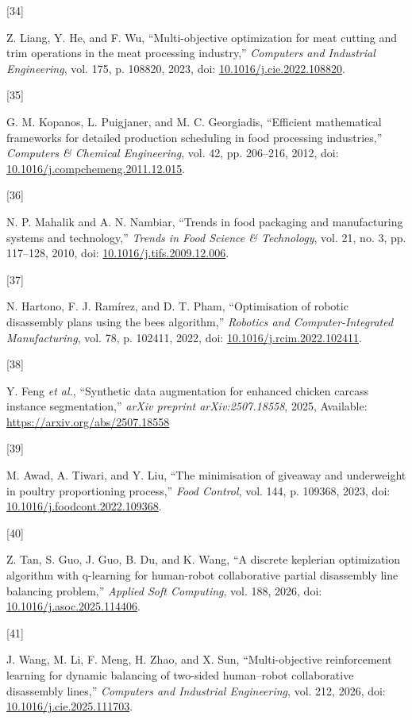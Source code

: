 \documentclass[
  spanish,
  12pt,
]{article}
\newlength{\cslhangindent}
\newlength{\csllabelwidth}
\newenvironment{CSLReferences}[2] %
 {\begin{list}{}{%
  \setlength{\itemindent}{0pt}
  \setlength{\leftmargin}{0pt}
  \setlength{\parsep}{0pt}
  \ifodd #1
   \setlength{\leftmargin}{\cslhangindent}
   \setlength{\itemindent}{-1\cslhangindent}
  \fi
  \setlength{\itemsep}{#2\baselineskip}}}
 {\end{list}}
\newcommand{\CSLLeftMargin}[1]{\parbox[t]{\csllabelwidth}{\strut#1\strut}}
\newcommand{\CSLRightInline}[1]{\parbox[t]{\linewidth - \csllabelwidth}{\strut#1\strut}}
\begin{document}
\begin{CSLReferences}{0}{0}
\CSLLeftMargin{{[}34{]} }%
\CSLRightInline{Z. Liang, Y. He, and F. Wu, {``Multi-objective
optimization for meat cutting and trim operations in the meat processing
industry,''} \emph{Computers and Industrial Engineering}, vol. 175, p.
108820, 2023, doi:
\href{https://doi.org/10.1016/j.cie.2022.108820}{10.1016/j.cie.2022.108820}.}

\CSLLeftMargin{{[}35{]} }%
\CSLRightInline{G. M. Kopanos, L. Puigjaner, and M. C. Georgiadis,
{``Efficient mathematical frameworks for detailed production scheduling
in food processing industries,''} \emph{Computers \& Chemical
Engineering}, vol. 42, pp. 206--216, 2012, doi:
\href{https://doi.org/10.1016/j.compchemeng.2011.12.015}{10.1016/j.compchemeng.2011.12.015}.}

\CSLLeftMargin{{[}36{]} }%
\CSLRightInline{N. P. Mahalik and A. N. Nambiar, {``Trends in food
packaging and manufacturing systems and technology,''} \emph{Trends in
Food Science \& Technology}, vol. 21, no. 3, pp. 117--128, 2010, doi:
\href{https://doi.org/10.1016/j.tifs.2009.12.006}{10.1016/j.tifs.2009.12.006}.}

\CSLLeftMargin{{[}37{]} }%
\CSLRightInline{N. Hartono, F. J. Ramírez, and D. T. Pham,
{``Optimisation of robotic disassembly plans using the bees
algorithm,''} \emph{Robotics and Computer-Integrated Manufacturing},
vol. 78, p. 102411, 2022, doi:
\href{https://doi.org/10.1016/j.rcim.2022.102411}{10.1016/j.rcim.2022.102411}.}

\CSLLeftMargin{{[}38{]} }%
\CSLRightInline{Y. Feng \emph{et al.}, {``Synthetic data augmentation
for enhanced chicken carcass instance segmentation,''} \emph{arXiv
preprint arXiv:2507.18558}, 2025, Available:
\url{https://arxiv.org/abs/2507.18558}}

\CSLLeftMargin{{[}39{]} }%
\CSLRightInline{M. Awad, A. Tiwari, and Y. Liu, {``The minimisation of
giveaway and underweight in poultry proportioning process,''} \emph{Food
Control}, vol. 144, p. 109368, 2023, doi:
\href{https://doi.org/10.1016/j.foodcont.2022.109368}{10.1016/j.foodcont.2022.109368}.}

\CSLLeftMargin{{[}40{]} }%
\CSLRightInline{Z. Tan, S. Guo, J. Guo, B. Du, and K. Wang, {``A
discrete keplerian optimization algorithm with q-learning for
human-robot collaborative partial disassembly line balancing problem,''}
\emph{Applied Soft Computing}, vol. 188, 2026, doi:
\href{https://doi.org/10.1016/j.asoc.2025.114406}{10.1016/j.asoc.2025.114406}.}

\CSLLeftMargin{{[}41{]} }%
\CSLRightInline{J. Wang, M. Li, F. Meng, H. Zhao, and X. Sun,
{``Multi-objective reinforcement learning for dynamic balancing of
two-sided human--robot collaborative disassembly lines,''}
\emph{Computers and Industrial Engineering}, vol. 212, 2026, doi:
\href{https://doi.org/10.1016/j.cie.2025.111703}{10.1016/j.cie.2025.111703}.}

\end{CSLReferences}
\end{document}
